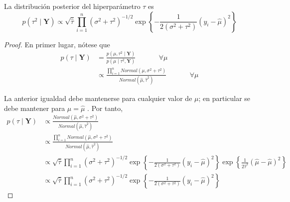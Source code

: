 \documentclass[10pt,openright]{book}\usepackage[]{graphicx}\usepackage[]{color}
\begin{document}
\begin{Res}
La distribuci\'on posterior del hiperpar\'ametro $\tau$ es
\begin{equation*}
p(\tau^2 \mid \mathbf{Y})
\propto \sqrt{\hat{\tau}} \prod_{i=1}^n (\sigma^2+\tau^2)^{-1/2}\exp\left\{-\frac{1}{2(\sigma^2+\tau^2)}(y_i-\hat{\mu})^2\right\}
\end{equation*}
\end{Res}

\begin{proof}
En primer lugar, n\'otese que
\begin{align*}
p(\tau \mid \mathbf{Y})&= \frac{p(\mu,\tau^2 \mid \mathbf{Y})}{p(\mu \mid \tau^2,\mathbf{Y})}
\ \ \ \ \ \ \ \ \ \ \ \ \ \ \ \forall \mu \\
&\propto \frac{\prod_{i=1}^n Normal(\mu,\sigma^2+\tau^2)}{Normal(\hat{\mu},\hat{\tau}^2)}
\ \ \ \ \ \ \ \ \ \ \ \ \ \ \ \forall \mu
\end{align*}

La anterior igualdad debe mantenerse para cualquier valor de $\mu$; en particular se debe mantener para $\mu=\hat{\mu}$ \cite{Gelman03}. Por tanto,
\begin{align*}
p(\tau \mid \mathbf{Y}) &\propto \frac{Normal(\hat{\mu},\sigma^2+\tau^2)}{Normal(\hat{\mu},\hat{\tau}^2)}\\
&\propto \frac{\prod_{i=1}^n Normal(\hat{\mu},\sigma^2+\tau^2)}{Normal(\hat{\mu},\hat{\tau}^2)}\\
&\propto \sqrt{\hat{\tau}}\prod_{i=1}^n (\sigma^2+\tau^2)^{-1/2}\exp\left\{-\frac{1}{2(\sigma^2+\tau^2)}(y_i-\hat{\mu})^2\right\} \exp\left\{\frac{1}{2\hat{\tau}^2}(\hat{\mu}-\hat{\mu})^2\right\}\\
&\propto \sqrt{\hat{\tau}}\prod_{i=1}^n (\sigma^2+\tau^2)^{-1/2}\exp\left\{-\frac{1}{2(\sigma^2+\tau^2)}(y_i-\hat{\mu})^2\right\}
\end{align*}
\end{proof}
\end{document}
